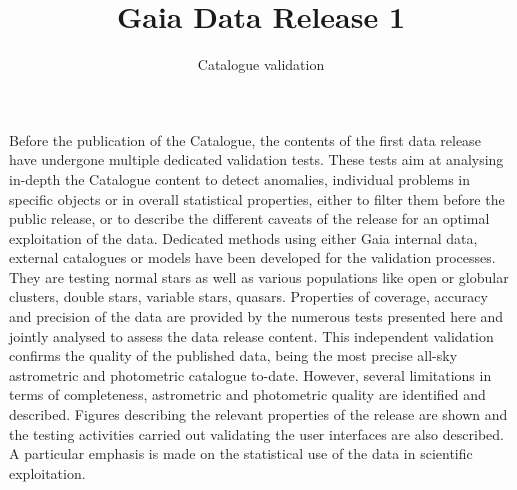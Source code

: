 \usepackage{graphicx}
\usepackage{txfonts}
\usepackage{xcolor}

%

\usepackage{natbib}



 

   \title{Gaia Data Release 1}

   \subtitle{Catalogue validation 
   }

   

   \date{ }

 
\abstract
{
Before the publication of the {\gaia} Catalogue, the contents of the first data release have 
undergone multiple dedicated validation tests. 
}
{
These tests aim at analysing in-depth the Catalogue content to detect anomalies, 
individual problems in specific objects or in overall statistical properties, 
either to filter them before the public release, or to describe the different caveats of the 
release for an optimal exploitation of the data.
}
{
Dedicated methods using either Gaia internal data, external catalogues or models have been 
developed for the validation processes. 
They are testing normal stars as well as various populations like open or globular 
clusters, double stars, variable stars, quasars. 
Properties of coverage, accuracy and precision of the data are provided by the numerous 
tests presented here and jointly analysed to assess the data release content.
}
{
This independent validation confirms the quality of the published data, {} being the 
most precise all-sky astrometric and photometric catalogue to-date. However, several 
limitations in terms of completeness, astrometric and photometric quality are identified
and described. Figures describing the relevant properties of the release are shown
and the testing activities carried out validating the user interfaces are also described. 
A particular emphasis is made on the statistical use of the data in scientific exploitation.
}
{}

